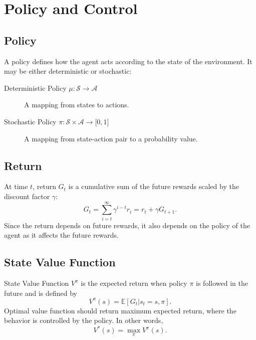 \section{Policy and Control}
\label{sec:policy_control}

\subsection{Policy}

A policy defines how the agent acts according to the state of the environment. 
It may be either deterministic or stochastic: 

\begin{description}
	\item[Deterministic Policy $\mu \colon \mathcal{S} \rightarrow \mathcal{A}$] 
	A mapping from states to actions.
	\item[Stochastic Policy $\pi \colon \mathcal{S} \times \mathcal{A} \rightarrow \lbrack 0,1 \rbrack$] 
	A mapping from state-action pair to a probability value.
\end{description}

\subsection{Return}

At time $t$, return $G_t$ is a cumulative sum of the future rewards scaled by the discount factor $\gamma$: 
\begin{equation}
\label{eqn:return_dfn}
G_t = \sum_{i=t}^{\infty} \gamma^{i-t} r_i = r_t + \gamma G_{t+1}.
\end{equation}
Since the return depends on future rewards, it also depends on the  policy of the agent as it affects the future rewards.

\subsection{State Value Function}

State Value Function $V^{\pi}$ is the expected return when policy $\pi$ is followed in the future and is defined by
\begin{equation}
\label{eqn:v_def}
V^{\pi}(s) = \mathbb{E}[G_t|s_t=s, \pi]. %
\end{equation}
Optimal value function should return maximum expected return, where 
the behavior is controlled by the policy. 
In other words, 
\begin{equation}
\label{eqn:max_v}
V^{*}(s) = \max_{\pi} V^{\pi}(s).
\end{equation}

